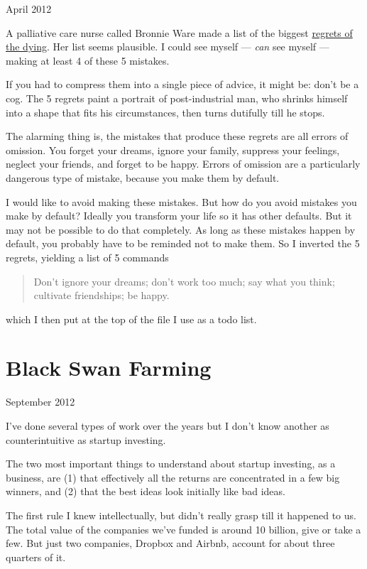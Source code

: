 \documentclass[12pt]{book}
\begin{document}
April 2012

A palliative care nurse called Bronnie Ware made a list of the biggest
\href{http://bronnieware.com/regrets-of-the-dying/}{regrets of the
dying}. Her list seems plausible. I could see myself --- \emph{can} see
myself --- making at least 4 of these 5 mistakes.

If you had to compress them into a single piece of advice, it might be:
don't be a cog. The 5 regrets paint a portrait of post-industrial man,
who shrinks himself into a shape that fits his circumstances, then turns
dutifully till he stops.

The alarming thing is, the mistakes that produce these regrets are all
errors of omission. You forget your dreams, ignore your family, suppress
your feelings, neglect your friends, and forget to be happy. Errors of
omission are a particularly dangerous type of mistake, because you make
them by default.

I would like to avoid making these mistakes. But how do you avoid
mistakes you make by default? Ideally you transform your life so it has
other defaults. But it may not be possible to do that completely. As
long as these mistakes happen by default, you probably have to be
reminded not to make them. So I inverted the 5 regrets, yielding a list
of 5 commands

\begin{quote}
Don't ignore your dreams; don't work too much; say what you think;
cultivate friendships; be happy.
\end{quote}

which I then put at the top of the file I use as a todo list.
\chapter{Black Swan Farming}

September 2012

I've done several types of work over the years but I don't know another
as counterintuitive as startup investing.

The two most important things to understand about startup investing, as
a business, are (1) that effectively all the returns are concentrated in
a few big winners, and (2) that the best ideas look initially like bad
ideas.

The first rule I knew intellectually, but didn't really grasp till it
happened to us. The total value of the companies we've funded is around
10 billion, give or take a few. But just two companies, Dropbox and
Airbnb, account for about three quarters of it.
\end{document}
